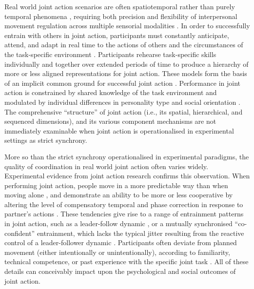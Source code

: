 \begin{CJK}{UTF8}{gbsn}
Real world joint action scenarios are often spatiotemporal rather than purely temporal phenomena \citep{Phillips-Silver2012}, requiring both precision and flexibility of interpersonal movement regulation across multiple sensorial modalities \citep{Keller2014}.  In order to successfully entrain with others in joint action, participants must constantly anticipate, attend, and adapt in real time to the actions of others and the circumstances of the task-specific environment \citep{Vesper2017}. Participants rehearse task-specific skills individually and together over extended periods of time to produce a hierarchy of more or less aligned representations for joint action. These models form the basis of an implicit common ground for successful joint action \citep{Noy2017}.  Performance in joint action is constrained by shared knowledge of the task environment \citep{Vesper2017} and modulated by individual differences in personality type and social orientation \citep{Marsh2009,Keller2014}.  The comprehensive ``structure'' of joint action (i.e., its spatial, hierarchical, and sequenced dimensions),  and its various component mechanisms are not immediately examinable when joint action is operationalised in experimental settings as strict synchrony.

More so than the strict synchrony operationalised in experimental paradigms, the quality of coordination in real world joint action often varies widely. Experimental evidence from joint action research confirms this observation.  When performing joint action, people move in a more predictable way than when moving alone \citep{Vesper2011}, and demonstrate an ability to be more or less cooperative by altering the level of compensatory temporal and phase correction in response to partner's actions \citep{Repp2008}.  These tendencies give rise to a range of entrainment patterns in joint action, such as a leader-follow dynamic \citep[usually in situations where there is a skill disparity between participants, see][]{Fairhurst2014}, or a mutually synchronised ``co-confident'' entrainment, which lacks the typical jitter resulting from the reactive control of a leader-follower dynamic \citep{Noy2011,Noy2015}.  Participants often deviate from planned movement (either intentionally or unintentionally), according to familiarity, technical competence, or past experience with the specific joint task \citep{Goebl2009}.  All of these details can conceivably impact upon the psychological and social outcomes of joint action.


\end{CJK}
